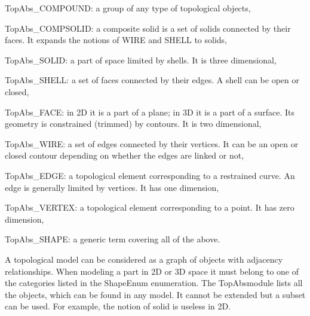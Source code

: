 \begin{DoxyItemize}
\item Top\+Abs\+\_\+\+C\+O\+M\+P\+O\+U\+ND\+: a group of any type of topological objects,
\item Top\+Abs\+\_\+\+C\+O\+M\+P\+S\+O\+L\+ID\+: a composite solid is a set of solids connected by their faces. It expands the notions of W\+I\+RE and S\+H\+E\+LL to solids,
\item Top\+Abs\+\_\+\+S\+O\+L\+ID\+: a part of space limited by shells. It is three dimensional,
\item Top\+Abs\+\_\+\+S\+H\+E\+LL\+: a set of faces connected by their edges. A shell can be open or closed,
\item Top\+Abs\+\_\+\+F\+A\+CE\+: in 2D it is a part of a plane; in 3D it is a part of a surface. Its geometry is constrained (trimmed) by contours. It is two dimensional,
\item Top\+Abs\+\_\+\+W\+I\+RE\+: a set of edges connected by their vertices. It can be an open or closed contour depending on whether the edges are linked or not,
\item Top\+Abs\+\_\+\+E\+D\+GE\+: a topological element corresponding to a restrained curve. An edge is generally limited by vertices. It has one dimension,
\item Top\+Abs\+\_\+\+V\+E\+R\+T\+EX\+: a topological element corresponding to a point. It has zero dimension,
\item Top\+Abs\+\_\+\+S\+H\+A\+PE\+: a generic term covering all of the above.
\end{DoxyItemize}

A topological model can be considered as a graph of objects with adjacency relationships. When modeling a part in 2D or 3D space it must belong to one of the categories listed in the Shape\+Enum enumeration. The Top\+Absmodule lists all the objects, which can be found in any model. It cannot be extended but a subset can be used. For example, the notion of solid is useless in 2D.

